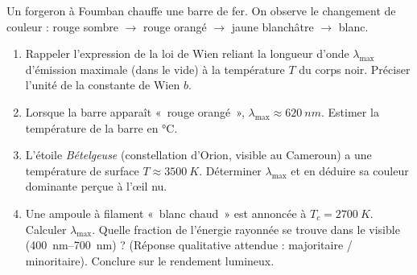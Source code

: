 \documentclass[11pt]{article}
\begin{document}
\begin{exercice}
Un forgeron à Foumban chauffe une barre de fer. On observe le changement de couleur : rouge sombre $\to$ rouge orangé $\to$ jaune blanchâtre $\to$ blanc.
\begin{enumerate}
    \item Rappeler l'expression de la loi de Wien reliant la longueur d'onde $\lambda_{\text{max}}$ d'émission maximale (dans le vide) à la température $T$ du corps noir. Préciser l'unité de la constante de Wien $b$.
    \item Lorsque la barre apparaît «~rouge orangé~», $\lambda_{\text{max}} \approx \SI{620}{nm}$. Estimer la température de la barre en °C.
    \item L'étoile \textit{Bételgeuse} (constellation d'Orion, visible au Cameroun) a une température de surface $T \approx \SI{3500}{K}$. Déterminer $\lambda_{\text{max}}$ et en déduire sa couleur dominante perçue à l'œil nu.
    \item Une ampoule à filament «~blanc chaud~» est annoncée à $T_c = \SI{2700}{K}$. Calculer $\lambda_{\text{max}}$. Quelle fraction de l'énergie rayonnée se trouve dans le visible (\SIrange{400}{700}{nm}) ? (Réponse qualitative attendue : majoritaire / minoritaire). Conclure sur le rendement lumineux.
\end{enumerate}
\end{exercice}
\end{document}
